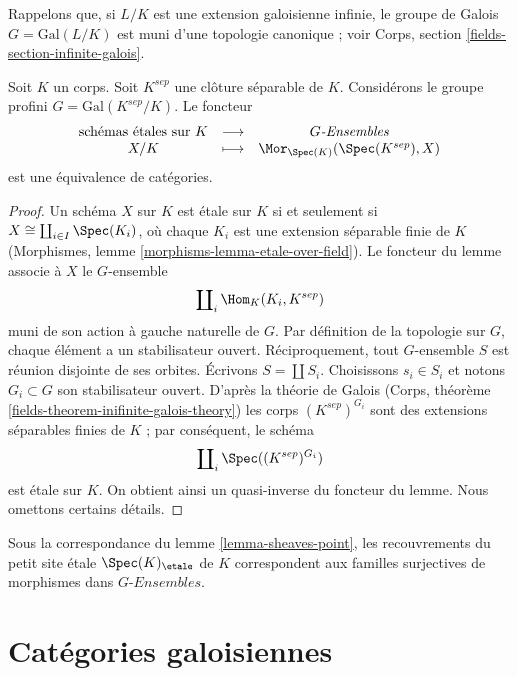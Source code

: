 \medskip\noindent
Rappelons que, si $L/K$ est une extension galoisienne infinie, le groupe de
Galois $G = \text{Gal}(L/K)$ est muni d'une topologie canonique ; voir
Corps, section \ref{fields-section-infinite-galois}.

\begin{lemma}
\label{lemma-sheaves-point}
Soit $K$ un corps. Soit $K^{sep}$ une clôture séparable de $K$.
Considérons le groupe profini $G = \text{Gal}(K^{sep}/K)$.
Le foncteur
$$
\begin{matrix}
\text{schémas étales sur }K &
\longrightarrow &
G\textit{-Ensembles} \\
X/K & \longmapsto &
\Mor_{\Spec(K)}(\Spec(K^{sep}), X)
\end{matrix}
$$
est une équivalence de catégories.
\end{lemma}

\begin{proof}
Un schéma $X$ sur $K$ est étale sur $K$ si et seulement si
$X \cong \coprod_{i\in I} \Spec(K_i)$, où chaque $K_i$ est une extension
séparable finie de $K$
(Morphismes, lemme \ref{morphisms-lemma-etale-over-field}).
Le foncteur du lemme associe à $X$ le $G$-ensemble
$$
\coprod\nolimits_i \Hom_K(K_i, K^{sep})
$$
muni de son action à gauche naturelle de $G$. Par définition de la topologie
sur $G$, chaque élément a un stabilisateur ouvert. Réciproquement, tout
$G$-ensemble $S$ est réunion disjointe de ses orbites. Écrivons
$S = \coprod S_i$. Choisissons $s_i \in S_i$ et notons $G_i \subset G$ son
stabilisateur ouvert. D'après la théorie de Galois
(Corps, théorème \ref{fields-theorem-inifinite-galois-theory})
les corps $(K^{sep})^{G_i}$ sont des extensions séparables finies de $K$ ;
par conséquent, le schéma
$$
\coprod\nolimits_i \Spec((K^{sep})^{G_i})
$$
est étale sur $K$. On obtient ainsi un quasi-inverse du foncteur du lemme.
Nous omettons certains détails.
\end{proof}

\begin{remark}
\label{remark-covering-surjective}
Sous la correspondance du lemme \ref{lemma-sheaves-point}, les recouvrements
du petit site étale $\Spec(K)_\etale$ de $K$ correspondent aux familles
surjectives de morphismes dans $G\textit{-Ensembles}$.
\end{remark}









\section{Catégories galoisiennes}
\label{section-galois}

